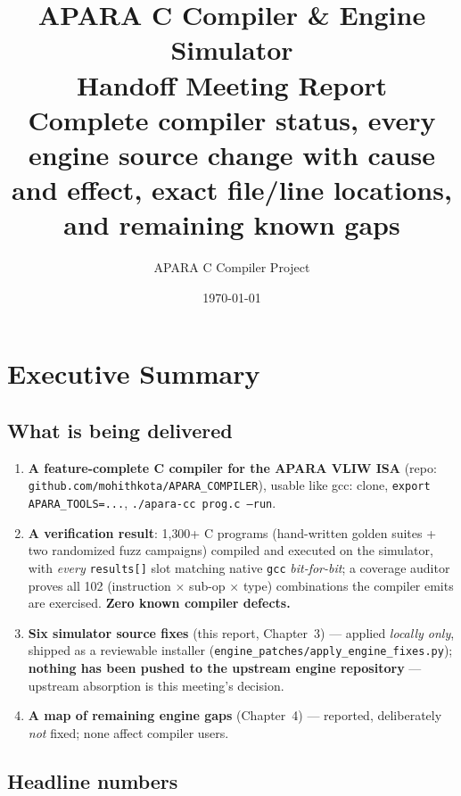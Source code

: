 \documentclass[11pt,a4paper]{report}
\title{\textbf{APARA C Compiler \& Engine Simulator \\ Handoff Meeting Report} \\
\large Complete compiler status, every engine source change with cause and
effect, exact file/line locations, and remaining known gaps}
\author{APARA C Compiler Project}
\date{\today}
\begin{document}
\maketitle
\tableofcontents

\chapter{Executive Summary}

\section{What is being delivered}

\begin{enumerate}[itemsep=2pt]
  \item \textbf{A feature-complete C compiler for the APARA VLIW ISA}
        (repo: \texttt{github.com/mohithkota/APARA\_COMPILER}), usable like
        gcc: clone, \texttt{export APARA\_TOOLS=...},
        \texttt{./apara-cc prog.c --run}.
  \item \textbf{A verification result}: 1{,}300+ C programs (hand-written
        golden suites + two randomized fuzz campaigns) compiled and executed
        on the simulator, with \emph{every} \texttt{results[]} slot matching
        native \texttt{gcc} \emph{bit-for-bit}; a coverage auditor proves all
        102 (instruction $\times$ sub-op $\times$ type) combinations the
        compiler emits are exercised. \textbf{Zero known compiler defects.}
  \item \textbf{Six simulator source fixes} (this report, Chapter~3) ---
        applied \emph{locally only}, shipped as a reviewable installer
        (\texttt{engine\_patches/apply\_engine\_fixes.py}); \textbf{nothing
        has been pushed to the upstream engine repository} --- upstream
        absorption is this meeting's decision.
  \item \textbf{A map of remaining engine gaps} (Chapter~4) --- reported,
        deliberately \emph{not} fixed; none affect compiler users.
\end{enumerate}

\section{Headline numbers}
\end{document}
